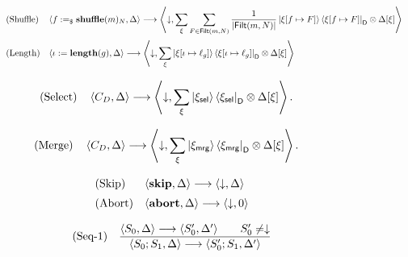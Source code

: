 \documentclass[acmsmall,screen,review,anonymous,nonacm]{acmart}
\theoremstyle{defn_style}
\begin{document}
\begin{figure}[H]
\centering
\scriptsize

\[
\begin{array}{ll}
\text{\rm (Shuffle)}
&
\displaystyle
\left\langle
f:=_{\$}\mathbf{shuffle}(m)_N,\Delta
\right\rangle
\longrightarrow
\left\langle
\downarrow,
\sum_{\xi}
\sum_{F\in\mathsf{Filt}(m,N)}
\frac{1}{|\mathsf{Filt}(m,N)|}
\ket{\xi[f\mapsto F]}\bra{\xi[f\mapsto F]}_{\mathsf D}
\otimes
\Delta[\xi]
\right\rangle
\\[4ex]

\text{\rm (Length)}
&
\displaystyle
\left\langle
\iota:=\mathbf{length}(g),\Delta
\right\rangle
\longrightarrow
\left\langle
\downarrow,
\sum_{\xi}
\ket{\xi[\iota\mapsto \ell_g]}\bra{\xi[\iota\mapsto \ell_g]}_{\mathsf D}
\otimes
\Delta[\xi]
\right\rangle
\end{array}
\]

\noindent
\begin{minipage}[t]{0.48\textwidth}
\[
\begin{aligned}
&
\text{\rm (Select)}
\quad
\left\langle C_D,\Delta\right\rangle
\longrightarrow
\left\langle
\downarrow,
\sum_{\xi}
\ket{\xi_{\mathsf{sel}}}\bra{\xi_{\mathsf{sel}}}_{\mathsf D}
\otimes
\Delta[\xi]
\right\rangle .
\end{aligned}
\]
\end{minipage}
\hfill
\begin{minipage}[t]{0.48\textwidth}
\[
\begin{aligned}
&
\text{\rm (Merge)}
\quad
\left\langle C_D,\Delta\right\rangle
\longrightarrow
\left\langle
\downarrow,
\sum_{\xi}
\ket{\xi_{\mathsf{mrg}}}\bra{\xi_{\mathsf{mrg}}}_{\mathsf D}
\otimes
\Delta[\xi]
\right\rangle .
\end{aligned}
\]
\end{minipage}

\vspace{0.5ex}

\noindent
\begin{minipage}[t]{0.35\textwidth}
\[
\begin{array}{ll}
\text{\rm (Skip)}
&
\langle \mathbf{skip},\Delta\rangle
\longrightarrow
\langle \downarrow,\Delta\rangle
\\[1.2ex]

\text{\rm (Abort)}
&
\langle \mathbf{abort},\Delta\rangle
\longrightarrow
\langle \downarrow,0\rangle
\end{array}
\]
\end{minipage}
\hfill
\begin{minipage}[t]{0.60\textwidth}
\[
\begin{array}{ll}
\text{\rm (Seq-1)}
&
\displaystyle
\frac{
\langle S_0,\Delta\rangle
\longrightarrow
\langle S'_0,\Delta'\rangle
\qquad
S'_0\neq\downarrow
}{
\langle S_0;S_1,\Delta\rangle
\longrightarrow
\langle S'_0;S_1,\Delta'\rangle
}
\\[3ex]


\end{array}\]
\end{minipage}
\end{figure}
\end{document}
